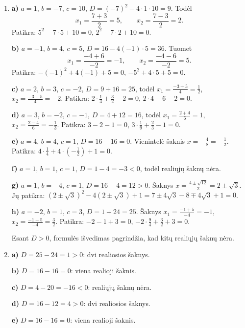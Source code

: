\documentclass[12pt,a4paper]{article}
\begin{document}
\begin{enumerate}
\textbf{c)} Kai $D=0$, abu formulės užrašai duoda tą pačią reikšmę: $\frac{-b+\sqrt0}{2a}=\frac{-b-\sqrt0}{2a}=-\frac b{2a}$. Pagal 4 temos 7 uždavinį daugianaris turi vieną realiąją šaknį tada ir tik tada, kai jo ekstremumo reikšmė lygi nuliui; 4 temos formulė $P_{\mathrm e}=-\frac D{4a}$ parodo, kad taip yra, kai $D=0$.

\textbf{d)} 10 a) $D=(-4)^2-4\cdot1\cdot3=4>0$ – dvi šaknys. 10 b) $D=16-16=0$ – viena. 10 c) $D=16-20=-4<0$ – šaknų nėra. Išvados sutampa su 10 uždavinio atsakymais.
\item \textbf{a)} $a=1$, $b=-7$, $c=10$, $D=(-7)^2-4\cdot1\cdot10=9$. Todėl
\[
x_1=\frac{7+3}{2}=5,\qquad x_2=\frac{7-3}{2}=2.
\]
Patikra: $5^2-7\cdot5+10=0$, $2^2-7\cdot2+10=0$.

\textbf{b)} $a=-1$, $b=4$, $c=5$, $D=16-4(-1)\cdot5=36$. Tuomet
\[
x_1=\frac{-4+6}{-2}=-1,\qquad x_2=\frac{-4-6}{-2}=5.
\]
Patikra: $-(-1)^2+4(-1)+5=0$, $-5^2+4\cdot5+5=0$.

\textbf{c)} $a=2$, $b=3$, $c=-2$, $D=9+16=25$, todėl $x_1=\frac{-3+5}{4}=\frac12$, $x_2=\frac{-3-5}{4}=-2$. Patikra: $2\cdot\frac14+\frac32-2=0$, $2\cdot4-6-2=0$.

\textbf{d)} $a=3$, $b=-2$, $c=-1$, $D=4+12=16$, todėl $x_1=\frac{2+4}{6}=1$, $x_2=\frac{2-4}{6}=-\frac13$. Patikra: $3-2-1=0$, $3\cdot\frac19+\frac23-1=0$.

\textbf{e)} $a=4$, $b=4$, $c=1$, $D=16-16=0$. Vienintelė šaknis $x=-\frac4{8}=-\frac12$. Patikra: $4\cdot\frac14+4\cdot(-\frac12)+1=0$.

\textbf{f)} $a=1$, $b=1$, $c=1$, $D=1-4=-3<0$, todėl realiųjų šaknų nėra.

\textbf{g)} $a=1$, $b=-4$, $c=1$, $D=16-4=12>0$. Šaknys $x=\frac{4\pm\sqrt{12}}2=2\pm\sqrt3$. Jų patikra: $(2\pm\sqrt3)^2-4(2\pm\sqrt3)+1=7\pm4\sqrt3-8\mp4\sqrt3+1=0$.

\textbf{h)} $a=-2$, $b=1$, $c=3$, $D=1+24=25$. Šaknys $x_1=\frac{-1+5}{-4}=-1$, $x_2=\frac{-1-5}{-4}=\frac32$. Patikra: $-2-1+3=0$, $-2\cdot\frac94+\frac32+3=0$.

Esant $D>0$, formulės išvedimas pagrindžia, kad kitų realiųjų šaknų nėra.
\item \textbf{a)} $D=25-24=1>0$: dvi realiosios šaknys.

\textbf{b)} $D=16-16=0$: viena realioji šaknis.

\textbf{c)} $D=4-20=-16<0$: realiųjų šaknų nėra.

\textbf{d)} $D=16-12=4>0$: dvi realiosios šaknys.

\textbf{e)} $D=16-16=0$: viena realioji šaknis.


\end{enumerate}
\end{document}
